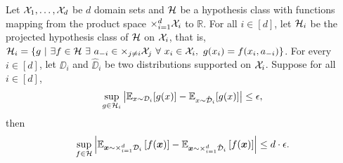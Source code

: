 %

\begin{lemma} \label{lem:approx product dist}
	Let ${\mathcal{X}}_1,\ldots, {\mathcal{X}}_d$ be $d$ domain sets and ${\mathcal{H}}$ be a hypothesis class with functions mapping from the product space $\times_{i=1}^{d} {\mathcal{X}}_i$ to $\mathbb{R}$. For all $i\in[d]$, let ${\mathcal{H}}_i$ be the projected hypothesis class of ${\mathcal{H}}$ on ${\mathcal{X}}_i$, that is, $\HH_i=\left\{g\ |\ \exists f\in \HH\ \exists\ a_{-i}\in \times_{j\neq i} \XX_j \ \forall\ x_i\in \XX_i, \ g(x_i) = f(x_i,a_{-i})\right\}$. For every $i\in[d]$, let $\DD_i$ and $\hat{\DD}_i$ be two distributions supported on ${\mathcal{X}}_i$. Suppose for all $i\in[d]$, $$\sup_{g\in{\mathcal{H}}_i}\left|{\mathbb{E}}_{x\sim {\mathcal{D}}_i}[g(x)]-{\mathbb{E}}_{x\sim \hat{{\mathcal{D}}}_i}[g(x)]\right|\leq \epsilon,$$ then $$\sup_{f\in{\mathcal{H}}} \left|{\mathbb{E}}_{\boldsymbol{x}\sim \times_{i=1}^d {\mathcal{D}}_i}\left[f(\boldsymbol{x})\right]-{\mathbb{E}}_{\boldsymbol{x}\sim \times_{i=1}^d \hat{{\mathcal{D}}}_i}\left[f(\boldsymbol{x})\right]\right|\leq d\cdot \epsilon.$$
\end{lemma} 

